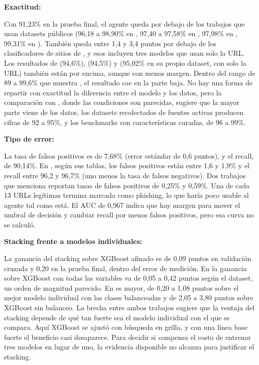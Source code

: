 \textbf{Exactitud:} \par 

Con 91,23\% en la prueba final, el agente queda por debajo de los trabajos que usan datasets públicos (96,18 a 98,90\% en \cite{kalabarige2022multilayer,kalabarige2023boosting}, 97,40 a 97,58\% en \cite{alsariera2020ai}, 97,98\% en \cite{sahingoz2019machine}, 99,31\% en \cite{rao2019detection}). También queda entre 1,4 y 3,4 puntos por debajo de los clasificadores de sitios de \cite{duy2024study}, y esos incluyen tres modelos que usan solo la URL. Los resultados de \cite{chiew2019hybrid} (94,6\%), \cite{zhu2019ofsnn} (94,5\%) y \cite{aljofey2020effective} (95,02\% en su propio dataset, con solo la URL) también están por encima, aunque con menos margen. Dentro del rango de 89 a 99,6\% que muestra \cite{ahmad2025across}, el resultado cae en la parte baja. No hay una forma de repartir con exactitud la diferencia entre el modelo y los datos, pero la comparación con \cite{duy2024study}, donde las condiciones son parecidas, sugiere que la mayor parte viene de los datos, los datasets recolectados de fuentes activas producen cifras de 92 a 95\%, y los benchmarks con características curadas, de 96 a 99\%. \newline

\textbf{Tipo de error:} \par 
La tasa de falsos positivos es de 7,68\% (error estándar de 0,6 puntos), y el recall, de 90,14\%. En \cite{alsariera2020ai}, según sus tablas, los falsos positivos están entre 1,6 y 1,9\% y el recall entre 96,2 y 96,7\% (uno menos la tasa de falsos negativos). Dos trabajos que \cite{duy2024study} menciona reportan tasas de falsos positivos de 0,25\% y 0,59\%. Una de cada 13 URLs legítimas termina marcada como phishing, lo que haría poco usable al agente tal como está. El AUC de 0,967 indica que hay margen para mover el umbral de decisión y cambiar recall por menos falsos positivos, pero esa curva no se calculó. \newline

\textbf{Stacking frente a modelos individuales:} \par
La ganancia del stacking sobre XGBoost afinado es de 0,09 puntos en validación cruzada y 0,20 en la prueba final, dentro del error de medición. En \cite{kalabarige2023boosting} la ganancia sobre XGBoost con todas las variables va de 0,05 a 0,42 puntos según el dataset, un orden de magnitud parecido. En \cite{kalabarige2022multilayer} es mayor, de 0,20 a 1,08 puntos sobre el mejor modelo individual con las clases balanceadas y de 2,05 a 3,80 puntos sobre XGBoost sin balanceo. La brecha entre ambos trabajos sugiere que la ventaja del stacking depende de qué tan fuerte sea el modelo individual con el que se compara. Aquí XGBoost se ajustó con búsqueda en grilla, y con una línea base fuerte el beneficio casi desaparece. Para decidir si compensa el costo de entrenar tres modelos en lugar de uno, la evidencia disponible no alcanza para justificar el stacking. \newline

